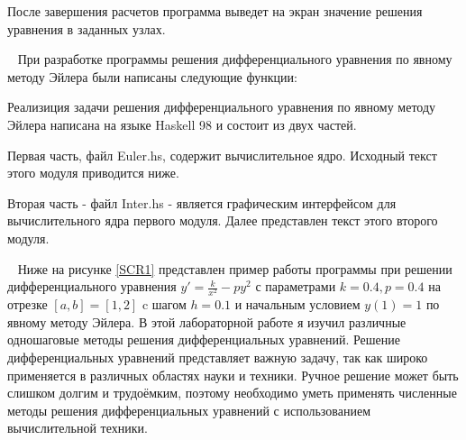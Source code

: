 После завершения расчетов программа выведет на экран значение решения уравнения в заданных узлах.

\ 
При разработке программы  решения дифференциального уравнения по явному методу Эйлера были написаны следующие функции:

\clearpage
{}
Реализиция задачи  решения дифференциального уравнения по явному методу Эйлера написана на языке Haskell 98 и состоит из двух частей.

Первая часть, файл Euler.hs, содержит вычислительное ядро. Исходный текст этого модуля приводится ниже.


Вторая часть - файл Inter.hs - является графическим интерфейсом для вычислительного ядра первого модуля. Далее представлен текст этого второго модуля.


\clearpage

\ 
Ниже на рисунке \ref{SCR1} представлен пример работы программы при  решении дифференциального уравнения $y'=\frac{k}{x^2}-py^2$ с параметрами $k=0.4, p=0.4$ на отрезке $[a,b]=[1,2]$ c шагом $h=0.1$ и начальным условием $y(1)=1$ по явному методу Эйлера. 
\clearpage
\ssec{Вывод}
В этой лабораторной работе я изучил различные одношаговые методы решения дифференциальных уравнений. Решение дифференциальных уравнений представляет важную задачу, так как широко применяется в различных областях науки и техники. Ручное решение может быть слишком долгим и трудоёмким, поэтому необходимо уметь применять численные методы решения дифференциальных уравнений с использованием вычислительной техники.

